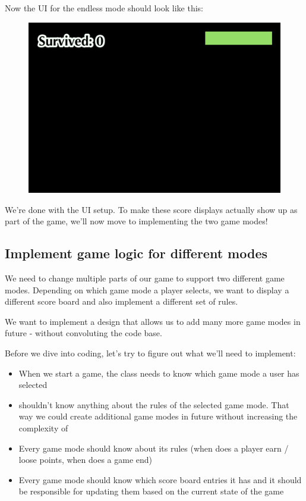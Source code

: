 Now the UI for the endless mode should look like this:

\begin{figure}[H]
    \centering
    \includegraphics[width=0.5\linewidth]{images/Chapter7/endless_mode_ui.png}
\end{figure}

We're done with the UI setup. To make these score displays actually show up as
part of the game, we'll now move to implementing the two game modes!

\subsection{Implement game logic for different modes}
We need to change multiple parts of our game to support two different game
modes. Depending on which game mode a player selects, we want to display a
different score board and also implement a different set of rules.

We want to implement a design that allows us to add many more game modes in
future - without convoluting the code base.

Before we dive into coding, let's try to figure out what we'll need to
implement:
\begin{itemize}
  \item When we start a game, the  class needs to know
  which game mode a user has selected
  \item {} shouldn't know
  anything about the rules of the selected game mode. That way we could create
  additional game modes in future without increasing the complexity of
  \item Every game mode should know about its rules (when does a player earn /
  loose points, when does a game end)
  \item Every game mode should know which score board entries it has and it
  should be responsible for updating them based on the current state of the game
\end{itemize}

